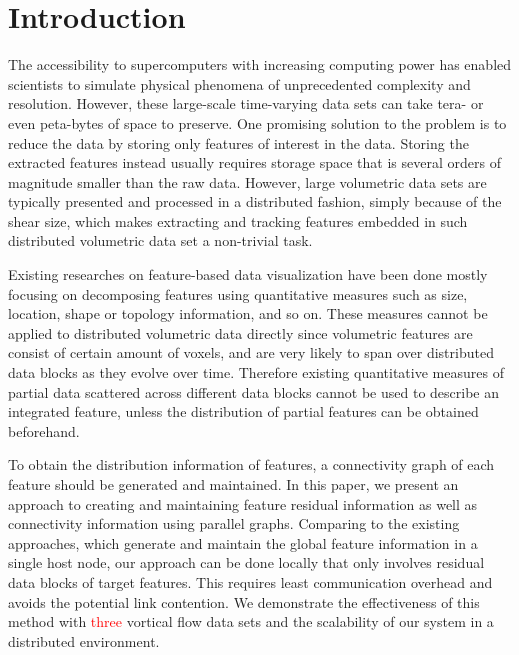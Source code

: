 \documentclass[10pt, conference, compsocconf]{IEEEtran}
\begin{document}
\section{Introduction}

The accessibility to supercomputers with increasing computing power has enabled scientists to simulate physical phenomena of unprecedented complexity and resolution. However, these large-scale time-varying data sets can take tera- or even peta-bytes of space to preserve. One promising solution to the problem is to reduce the data by storing only features of interest in the data. Storing the extracted features instead usually requires storage space that is several orders of magnitude smaller than the raw data. However, large volumetric data sets are typically presented and processed in a distributed fashion, simply because of the shear size, which makes extracting and tracking features embedded in such distributed volumetric data set a non-trivial task. 

Existing researches on feature-based data visualization have been done mostly focusing on decomposing features using quantitative measures such as size, location, shape or topology information, and so on. These measures cannot be applied to distributed volumetric data directly since volumetric features are consist of certain amount of voxels, and are very likely to span over distributed data blocks as they evolve over time. Therefore existing quantitative measures of partial data scattered across different data blocks cannot be used to describe an integrated feature, unless the distribution of partial features can be obtained beforehand.

To obtain the distribution information of features, a connectivity graph of each feature should be generated and maintained. In this paper, we present an approach to creating and maintaining feature residual information as well as connectivity information using parallel graphs. Comparing to the existing approaches, which generate and maintain the global feature information in a single host node, our approach can be done locally that only involves residual data blocks of target features. This requires least communication overhead and avoids the potential link contention. We demonstrate the effectiveness of this method with \textcolor{red}{three} vortical flow data sets and the scalability of our system in a distributed environment.
\end{document}
